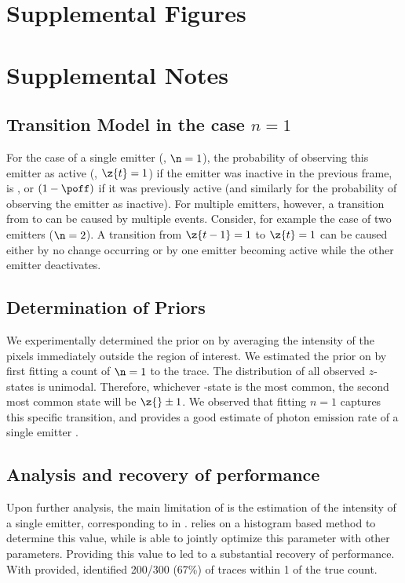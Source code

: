 \makeatletter
\renewcommand \thesection{S\@arabic\c@section}
\renewcommand\thetable{S\@arabic\c@table}
\renewcommand \thefigure{S\@arabic\c@figure}
\setcounter{figure}{0}   
\makeatother



\section{Supplemental Figures}


\clearpage

\section{Supplemental Notes}

\subsection{Transition Model in the case $n=1$} \label{n1_transition}
For the case of a single emitter (\ie, $\n=1$), the probability of observing
this emitter as active (\ie, $\z{t}=1$) if the emitter was
inactive in the previous frame, is \pon , or $(1-\poff)$ if 
it was previously active (and similarly for the probability of observing 
the emitter as inactive).
  For multiple emitters, however, a transition from  to  can be
  caused by multiple events. Consider, for example the case of two emitters
  ($\n=2$). A transition from $\z{t-1}=1$ to $\z{t}=1$ can be caused either by
  no change occurring or by one emitter becoming active while the other emitter 
  deactivates.

\subsection{Determination of Priors} \label{exp_priors}
We experimentally determined the prior on \rb by averaging the 
	intensity of the pixels immediately outside the region of interest.
	We estimated the prior on \re  by first fitting a count of $\n=1$ to the trace.
	The distribution of all observed $z$-states is unimodal.
	Therefore, whichever \z{}-state is the most common, the second most common state 
	will be $\z{} \pm 1$. 
	We observed that fitting $n=1$ captures this specific transition, and provides a good
	estimate of photon emission rate of a single emitter \re.

\subsection{Analysis and recovery of \lbfcs performance} \label{lbfcs_analysis}
Upon further analysis, the main limitation of \lbfcs is the estimation of the 
	intensity of a single emitter, corresponding to \re in \ours. 
	\lbfcs relies on a histogram based method to determine this value, while 
	\ours is able to jointly optimize this parameter with other parameters.
	Providing this value to \lbfcs led to a substantial recovery of performance.
	With \re provided, \lbfcs identified 200/300 (67\%) of traces within 1 of the true count.

